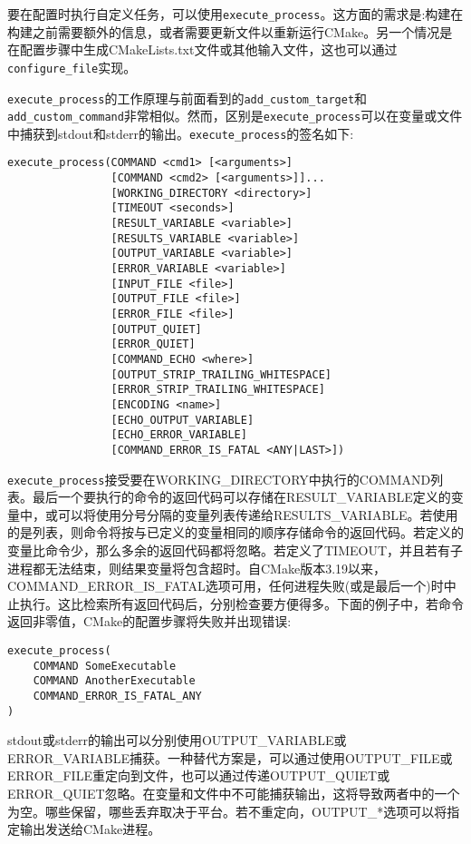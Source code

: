 
要在配置时执行自定义任务，可以使用\texttt{execute\_process}。这方面的需求是:构建在构建之前需要额外的信息，或者需要更新文件以重新运行CMake。另一个情况是在配置步骤中生成CMakeLists.txt文件或其他输入文件，这也可以通过\texttt{configure\_file}实现。

\texttt{execute\_process}的工作原理与前面看到的\texttt{add\_custom\_target}和\texttt{add\_custom\_command}非常相似。然而，区别是\texttt{execute\_process}可以在变量或文件中捕获到stdout和stderr的输出。\texttt{execute\_process}的签名如下:

\begin{lstlisting}[style=styleCMake]
execute_process(COMMAND <cmd1> [<arguments>]
				[COMMAND <cmd2> [<arguments>]]...
				[WORKING_DIRECTORY <directory>]
				[TIMEOUT <seconds>]
				[RESULT_VARIABLE <variable>]
				[RESULTS_VARIABLE <variable>]
				[OUTPUT_VARIABLE <variable>]
				[ERROR_VARIABLE <variable>]
				[INPUT_FILE <file>]
				[OUTPUT_FILE <file>]
				[ERROR_FILE <file>]
				[OUTPUT_QUIET]
				[ERROR_QUIET]
				[COMMAND_ECHO <where>]
				[OUTPUT_STRIP_TRAILING_WHITESPACE]
				[ERROR_STRIP_TRAILING_WHITESPACE]
				[ENCODING <name>]
				[ECHO_OUTPUT_VARIABLE]
				[ECHO_ERROR_VARIABLE]
				[COMMAND_ERROR_IS_FATAL <ANY|LAST>])
\end{lstlisting}

\texttt{execute\_process}接受要在WORKING\_DIRECTORY中执行的COMMAND列表。最后一个要执行的命令的返回代码可以存储在RESULT\_VARIABLE定义的变量中，或可以将使用分号分隔的变量列表传递给RESULTS\_VARIABLE。若使用的是列表，则命令将按与已定义的变量相同的顺序存储命令的返回代码。若定义的变量比命令少，那么多余的返回代码都将忽略。若定义了TIMEOUT，并且若有子进程都无法结束，则结果变量将包含超时。自CMake版本3.19以来，COMMAND\_ERROR\_IS\_FATAL选项可用，任何进程失败(或是最后一个)时中止执行。这比检索所有返回代码后，分别检查要方便得多。下面的例子中，若命令返回非零值，CMake的配置步骤将失败并出现错误:

\begin{lstlisting}[style=styleCMake]
execute_process(
	COMMAND SomeExecutable
	COMMAND AnotherExecutable
	COMMAND_ERROR_IS_FATAL_ANY
)
\end{lstlisting}

stdout或stderr的输出可以分别使用OUTPUT\_VARIABLE或ERROR\_VARIABLE捕获。一种替代方案是，可以通过使用OUTPUT\_FILE或ERROR\_FILE重定向到文件，也可以通过传递OUTPUT\_QUIET或ERROR\_QUIET忽略。在变量和文件中不可能捕获输出，这将导致两者中的一个为空。哪些保留，哪些丢弃取决于平台。若不重定向，OUTPUT\_*选项可以将指定输出发送给CMake进程。

